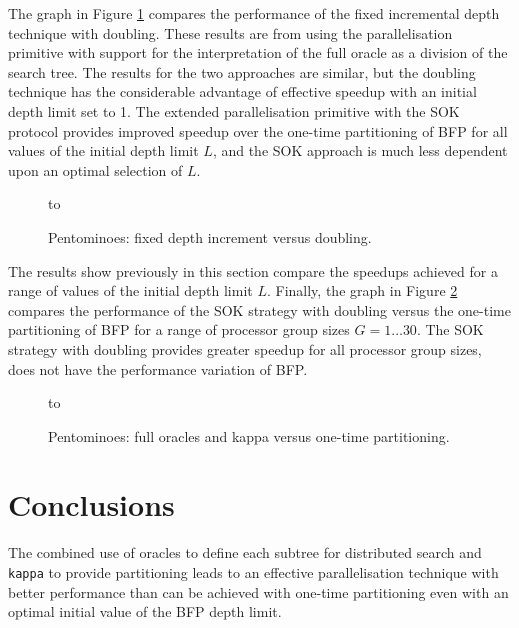 \enlargethispage{\baselineskip}  %
The graph in Figure \ref{spd_compare_fullorcs} compares the performance of the 
fixed incremental depth technique with doubling.  These results are from
using the parallelisation
primitive with support for the interpretation of the full oracle as a division of
the search tree.  The results for the two approaches are similar, but the doubling
technique has the considerable advantage of effective speedup with an initial
depth limit set to 1.  The extended parallelisation primitive with the SOK
protocol provides improved speedup over the one-time partitioning of BFP for
all values of the initial depth limit $L$, and the SOK approach is much less dependent
upon an optimal selection of $L$.

\begin{figure}[htb]
\vspace{20mm} \hbox to 
\caption{Pentominoes: fixed depth increment versus doubling.}
\vspace{5mm}
\label{spd_compare_fullorcs}
\end{figure}

\enlargethispage{-\baselineskip}  %
The results show previously in this section compare the speedups achieved for
a range of values of the initial depth limit $L$.  Finally,
the graph in Figure \ref{pent_G_1_30}
compares the performance of the SOK strategy with doubling versus the one-time
partitioning of BFP for a range of processor group sizes $G=1\ldots 30$.  The
SOK strategy with doubling provides greater speedup for all processor group
sizes, does not have the performance variation of BFP.

\begin{figure}[htb]
\vspace{5mm} \hbox to 
\caption{Pentominoes: full oracles and kappa versus one-time partitioning.}
\vspace{5mm}
\label{pent_G_1_30}
\end{figure}

\section{Conclusions} %

The combined use of oracles to define each subtree for distributed search and
\texttt{kappa} to provide partitioning leads to an effective parallelisation
technique with better performance than can be achieved with one-time partitioning
even with an optimal initial value of the BFP depth limit.

